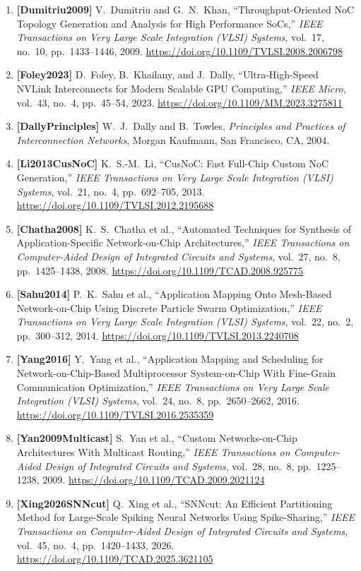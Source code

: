 \begin{enumerate}
    \item \textbf{[Dumitriu2009]} V.~Dumitriu and G.~N.~Khan, ``Throughput-Oriented NoC Topology Generation and Analysis for High Performance SoCs,'' \emph{IEEE Transactions on Very Large Scale Integration (VLSI) Systems}, vol.~17, no.~10, pp.~1433--1446, 2009. \url{https://doi.org/10.1109/TVLSI.2008.2006798}
    \item \textbf{[Foley2023]} D.~Foley, B.~Khailany, and J.~Dally, ``Ultra-High-Speed NVLink Interconnects for Modern Scalable GPU Computing,'' \emph{IEEE Micro}, vol.~43, no.~4, pp.~45--54, 2023. \url{https://doi.org/10.1109/MM.2023.3275811}
    \item \textbf{[DallyPrinciples]} W.~J.~Dally and B.~Towles, \emph{Principles and Practices of Interconnection Networks}, Morgan Kaufmann, San Francisco, CA, 2004.
    \item \textbf{[Li2013CusNoC]} K.~S.-M.~Li, ``CusNoC: Fast Full-Chip Custom NoC Generation,'' \emph{IEEE Transactions on Very Large Scale Integration (VLSI) Systems}, vol.~21, no.~4, pp.~692--705, 2013. \url{https://doi.org/10.1109/TVLSI.2012.2195688}
    \item \textbf{[Chatha2008]} K.~S.~Chatha et al., ``Automated Techniques for Synthesis of Application-Specific Network-on-Chip Architectures,'' \emph{IEEE Transactions on Computer-Aided Design of Integrated Circuits and Systems}, vol.~27, no.~8, pp.~1425--1438, 2008. \url{https://doi.org/10.1109/TCAD.2008.925775}
    \item \textbf{[Sahu2014]} P.~K.~Sahu et al., ``Application Mapping Onto Mesh-Based Network-on-Chip Using Discrete Particle Swarm Optimization,'' \emph{IEEE Transactions on Very Large Scale Integration (VLSI) Systems}, vol.~22, no.~2, pp.~300--312, 2014. \url{https://doi.org/10.1109/TVLSI.2013.2240708}
    \item \textbf{[Yang2016]} Y.~Yang et al., ``Application Mapping and Scheduling for Network-on-Chip-Based Multiprocessor System-on-Chip With Fine-Grain Communication Optimization,'' \emph{IEEE Transactions on Very Large Scale Integration (VLSI) Systems}, vol.~24, no.~8, pp.~2650--2662, 2016. \url{https://doi.org/10.1109/TVLSI.2016.2535359}
    \item \textbf{[Yan2009Multicast]} S.~Yan et al., ``Custom Networks-on-Chip Architectures With Multicast Routing,'' \emph{IEEE Transactions on Computer-Aided Design of Integrated Circuits and Systems}, vol.~28, no.~8, pp.~1225--1238, 2009. \url{https://doi.org/10.1109/TCAD.2009.2021124}
    \item \textbf{[Xing2026SNNcut]} Q.~Xing et al., ``SNNcut: An Efficient Partitioning Method for Large-Scale Spiking Neural Networks Using Spike-Sharing,'' \emph{IEEE Transactions on Computer-Aided Design of Integrated Circuits and Systems}, vol.~45, no.~4, pp.~1420--1433, 2026. \url{https://doi.org/10.1109/TCAD.2025.3621105}

\end{enumerate}
